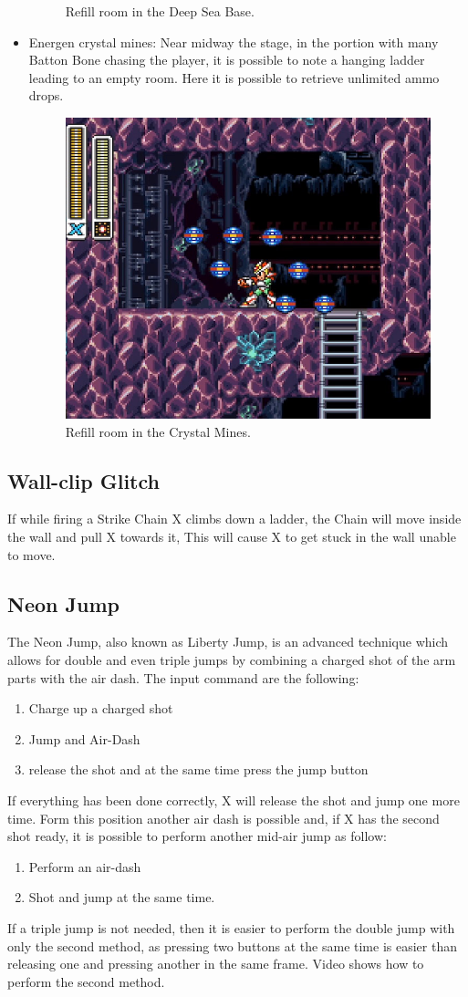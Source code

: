 \begin{itemize}
\begin{figure}[htp]
		\caption{Refill room in the Deep Sea Base.}
	\end{figure}
	\item Energen crystal mines: Near midway the stage, in the portion with many Batton Bone chasing the player, it is possible to note a hanging ladder leading to an empty room. Here it is possible to retrieve unlimited ammo drops.
	\begin{figure}[htp]
		\centering
		\includegraphics[width=.4\linewidth]{figures/X2/Crystal_snail/Crystal_farming_spot.png}
		\caption{Refill room in the Crystal Mines.}
	\end{figure}
\end{itemize}

\subsection{Wall-clip Glitch}
If while firing a Strike Chain X climbs down a ladder, the Chain will move inside the wall and pull X towards it, This will cause X to get stuck in the wall unable to move.

\subsection{Neon Jump}\label{Neon_jump}
The Neon Jump, also known as Liberty Jump, is an advanced technique which allows for double and even triple jumps by combining a charged shot of the arm parts with the air dash. The input command are the following:
\begin{enumerate}
	\item Charge up a charged shot
	\item Jump and Air-Dash
	\item release the shot and at the same time press the jump button
\end{enumerate}
If everything has been done correctly, X will release the shot and jump one more time. Form this position another air dash is possible and, if X has the second shot ready, it is possible to perform another mid-air jump as follow:
\begin{enumerate}
	\item Perform an air-dash
	\item Shot and jump at the same time.
\end{enumerate}
If a triple jump is not needed, then it is easier to perform the double jump with only the second method, as pressing two buttons at the same time is easier than releasing one and pressing another in the same frame. Video  shows how to perform the second method.

